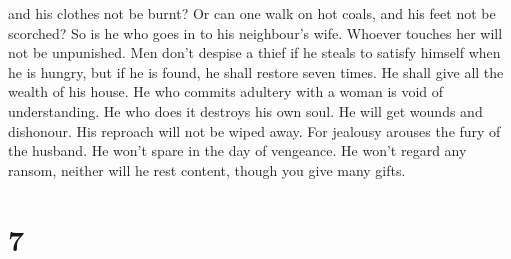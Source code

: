 and his clothes not be burnt?  Or can one walk on hot
coals, and his feet not be scorched?  So is he who goes
in to his neighbour's wife. Whoever touches her will not be unpunished.
 Men don't despise a thief if he steals to satisfy
himself when he is hungry,  but if he is found, he shall
restore seven times. He shall give all the wealth of his house.
 He who commits adultery with a woman is void of
understanding. He who does it destroys his own soul.  He
will get wounds and dishonour. His reproach will not be wiped away.
 For jealousy arouses the fury of the husband. He won't
spare in the day of vengeance.  He won't regard any
ransom, neither will he rest content, though you give many gifts.

\hypertarget{section-6}{%
\section{7}\label{section-6}}

